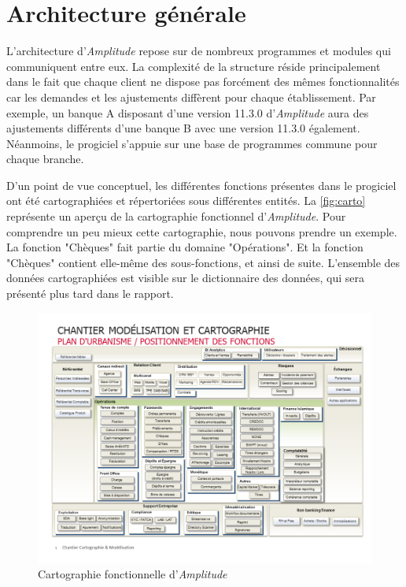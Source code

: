 \documentclass{polytech/polytech}
\begin{document}
\section{Architecture générale}
\label{sec:architectureAmplitude}

L'architecture d'\textit{Amplitude} repose sur de nombreux programmes et modules qui communiquent entre eux. La complexité de la structure réside principalement dans le fait que chaque client ne dispose pas forcément des mêmes fonctionnalités car les demandes et les ajustements diffèrent pour chaque établissement. Par exemple, un banque A disposant d'une version 11.3.0 d'\textit{Amplitude} aura des ajustements différents d'une banque B avec une version 11.3.0 également. Néanmoins, le progiciel s'appuie sur une base de programmes commune pour chaque branche. 

D'un point de vue conceptuel, les différentes fonctions présentes dans le progiciel ont été cartographiées et répertoriées sous différentes entités. La \autoref{fig:carto} représente un aperçu de la cartographie fonctionnel d'\textit{Amplitude}. Pour comprendre un peu mieux cette cartographie, nous pouvons prendre un exemple. La fonction "Chèques" fait partie du domaine "Opérations". Et la fonction "Chèques" contient elle-même des sous-fonctions, et ainsi de suite. L'ensemble des données cartographiées est visible sur le dictionnaire des données, qui sera présenté plus tard dans le rapport. 

\begin{figure}
	\includegraphics[scale=0.62]{images/Cartographie_fonctionnelle}
	\caption{Cartographie fonctionnelle d'\textit{Amplitude}}
	\label{fig:carto}
\end{figure}
\end{document}
